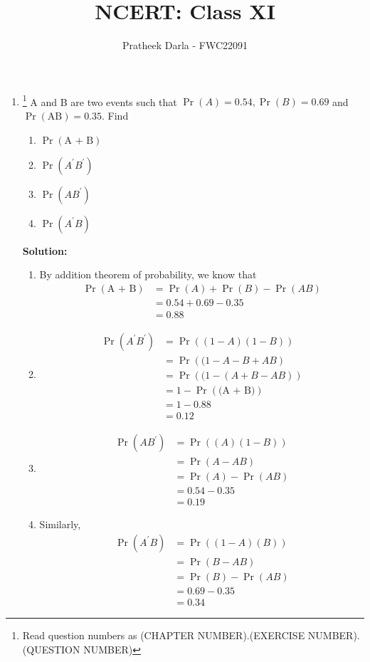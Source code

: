 \documentclass{article}
\providecommand{\pr}[1]{\ensuremath{\Pr\left(#1\right)}}
\newcommand{\solution}{\noindent \textbf{Solution: }}
\begin{document}
\title{NCERT: Class XI}
\author{\Large Pratheek Darla - FWC22091}
\date{}

\maketitle

\begin{enumerate}[label=16.\arabic{enumi}.\arabic{enumii}]%
\setcounter{enumi}{3}
\setcounter{enumii}{7}

\item \footnote{Read question numbers as (CHAPTER NUMBER).(EXERCISE NUMBER).(QUESTION NUMBER)} A and B are two events such that $\pr A=0.54, \pr B=0.69$ and  $\pr{\text{AB}} = 0.35$. Find\\[1ex]

\begin{enumerate}
\item $\pr{\text{A + B}} $ 
\item $\pr{A^{\prime} B^{\prime}} $ 
\item $\pr{A B^{\prime}} $ 
\item $\pr{A^{\prime} B} $  
\end{enumerate}

\solution 
\begin{enumerate}
\item By addition theorem of probability, we know that
\begin{align}
\pr{\text{A + B}} &= \pr A + \pr B - \pr {AB} \\
&= 0.54 + 0.69 - 0.35 \\
&= 0.88    
\end{align}

\item
\begin{align}
\pr{A^{\prime} B^{\prime}} &= \pr{(1 - A)(1 - B)} \\
 &= \pr{(1 - A - B + AB}  \\
 &= \pr{(1 - (A + B - AB)}  \\
 &= 1 - \pr{\text{(A + B)}} \\
 &= 1 - 0.88  \\
 &= 0.12
\end{align}

\item
\begin{align}
\pr{AB^{\prime}} &= \pr{(A)(1 - B)} \\
 &= \pr{A - AB} \\
 &= \pr A - \pr {AB} \\
 &= 0.54 - 0.35  \\
 &= 0.19 
\end{align}

\item Similarly, 
\begin{align}
\pr{A^{\prime} B} &= \pr{(1 - A)(B)}  \\
&= \pr{B - AB} \\
&= \pr B - \pr {AB} \\
&= 0.69 - 0.35 \\
&= 0.34
\end{align}
\end{enumerate}      

\end{enumerate}
\end{document}
